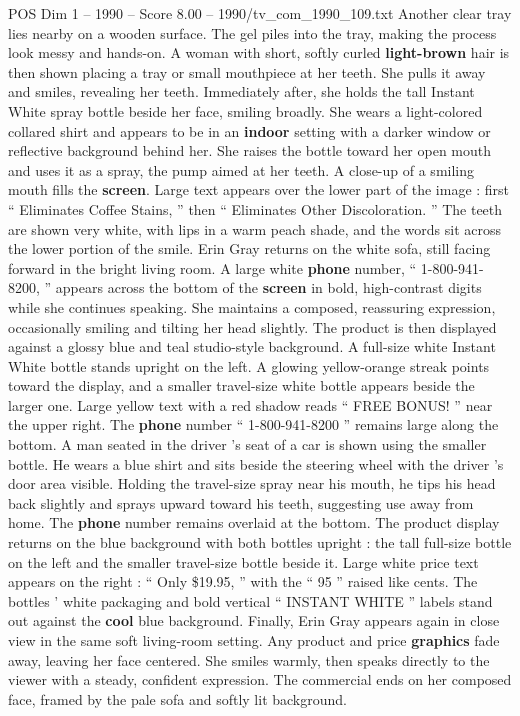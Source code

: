 \begin{textsample}{POS Dim 1 – 1990 – Score 8.00 – 1990/tv\_com\_1990\_109.txt}
Another clear tray lies nearby on a wooden surface.
The gel piles into the tray, making the process look messy and hands-on.
A woman with short, softly curled \textbf{light-brown} hair is then shown placing a tray or small mouthpiece at her teeth.
She pulls it away and smiles, revealing her teeth.
Immediately after, she holds the tall Instant White spray bottle beside her face, smiling broadly.
She wears a light-colored collared shirt and appears to be in an \textbf{indoor} setting with a darker window or reflective background behind her.
She raises the bottle toward her open mouth and uses it as a spray, the pump aimed at her teeth.
A close-up of a smiling mouth fills the \textbf{screen}.
Large text appears over the lower part of the image : first “ Eliminates Coffee Stains, ” then “ Eliminates Other Discoloration. ” The teeth are shown very white, with lips in a warm peach shade, and the words sit across the lower portion of the smile.
Erin Gray returns on the white sofa, still facing forward in the bright living room.
A large white \textbf{phone} number, “ 1-800-941-8200, ” appears across the bottom of the \textbf{screen} in bold, high-contrast digits while she continues speaking.
She maintains a composed, reassuring expression, occasionally smiling and tilting her head slightly.
The product is then displayed against a glossy blue and teal studio-style background.
A full-size white Instant White bottle stands upright on the left.
A glowing yellow-orange streak points toward the display, and a smaller travel-size white bottle appears beside the larger one.
Large yellow text with a red shadow reads “ FREE BONUS! ” near the upper right.
The \textbf{phone} number “ 1-800-941-8200 ” remains large along the bottom.
A man seated in the driver ’s seat of a car is shown using the smaller bottle.
He wears a blue shirt and sits beside the steering wheel with the driver ’s door area visible.
Holding the travel-size spray near his mouth, he tips his head back slightly and sprays upward toward his teeth, suggesting use away from home.
The \textbf{phone} number remains overlaid at the bottom.
The product display returns on the blue background with both bottles upright : the tall full-size bottle on the left and the smaller travel-size bottle beside it.
Large white price text appears on the right : “ Only \$19.95, ” with the “ 95 ” raised like cents.
The bottles ’ white packaging and bold vertical “ INSTANT WHITE ” labels stand out against the \textbf{cool} blue background.
Finally, Erin Gray appears again in close view in the same soft living-room setting.
Any product and price \textbf{graphics} fade away, leaving her face centered.
She smiles warmly, then speaks directly to the viewer with a steady, confident expression.
The commercial ends on her composed face, framed by the pale sofa and softly lit background.

\end{textsample}
